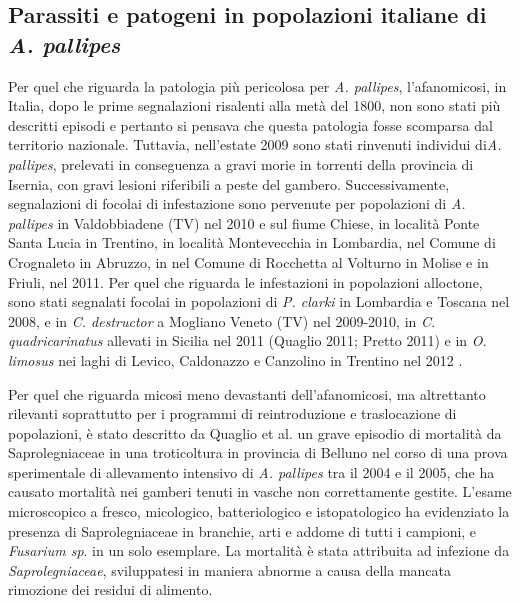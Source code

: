 \documentclass[11pt,a4paper,italian,twoside,openany]{memoir}
\newcommand{\etal}{et al. }
\begin{document}
\subsection{Parassiti e patogeni in popolazioni italiane di \emph{A. pallipes}}
\label{sub_parapat}
Per quel che riguarda la patologia più pericolosa per \emph{A. pallipes}, l'afanomicosi, in Italia, dopo le prime segnalazioni risalenti alla metà del 1800, non sono stati più descritti episodi e pertanto si pensava che questa patologia fosse scomparsa dal territorio nazionale. Tuttavia, nell'estate 2009 sono stati rinvenuti individui di\emph{A. pallipes}, prelevati in conseguenza a gravi morie in torrenti della provincia di Isernia, con gravi lesioni riferibili a peste del gambero. Successivamente, segnalazioni di focolai di infestazione sono pervenute per popolazioni di \emph{A. pallipes} in Valdobbiadene (TV) nel 2010 e sul fiume Chiese, in località Ponte Santa Lucia in Trentino, in località Montevecchia in Lombardia, nel Comune di Crognaleto in Abruzzo, in nel Comune di Rocchetta al Volturno in Molise e in Friuli, nel 2011. Per quel che riguarda le infestazioni in popolazioni alloctone, sono stati segnalati focolai in popolazioni di \emph{P. clarki} in Lombardia e Toscana nel 2008, e in \emph{C. destructor} a Mogliano Veneto (TV) nel 2009-2010, in \emph{C. quadricarinatus} allevati in Sicilia nel 2011 (Quaglio 2011; Pretto 2011) e in \emph{O. limosus} nei laghi di Levico, Caldonazzo e Canzolino in Trentino nel 2012 \cite{Minghetti 2012} \cite{Minghetti 2012b}.

Per quel che riguarda micosi meno devastanti dell'afanomicosi, ma altrettanto rilevanti soprattutto per i programmi di reintroduzione e traslocazione di popolazioni, è stato descritto da Quaglio \etal \cite{Quaglio 2008} un grave episodio di mortalità da Saprolegniaceae in una troticoltura in provincia di Belluno nel corso di una prova sperimentale di allevamento intensivo di \emph{A. pallipes} tra il 2004 e il 2005, che ha causato mortalità nei gamberi tenuti in vasche non correttamente gestite. L'esame microscopico a fresco, micologico, batteriologico e istopatologico ha evidenziato la presenza di Saprolegniaceae in branchie, arti e addome di tutti i campioni, e \emph{Fusarium sp}. in un solo esemplare. La mortalità è stata attribuita ad infezione da \emph{Saprolegniaceae}, sviluppatesi in maniera abnorme a causa della mancata rimozione dei residui di alimento.
\end{document}
